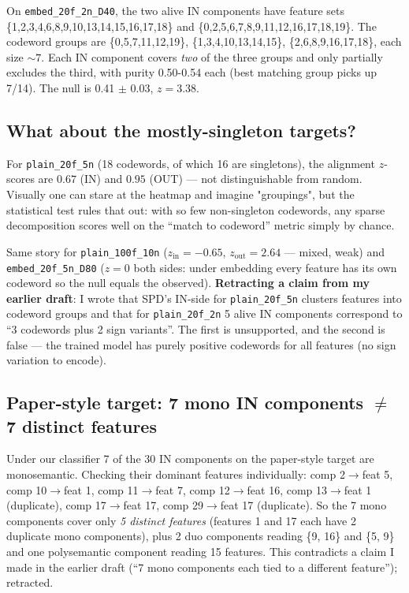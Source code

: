 \documentclass[11pt]{article}
\begin{document}
On \texttt{embed\_20f\_2n\_D40}, the two alive IN components have
feature sets \{1,2,3,4,6,8,9,10,13,14,15,16,17,18\} and
\{0,2,5,6,7,8,9,11,12,16,17,18,19\}. The codeword groups are
\{0,5,7,11,12,19\}, \{1,3,4,10,13,14,15\}, \{2,6,8,9,16,17,18\}, each
size $\sim 7$. Each IN component covers \emph{two} of the three groups
and only partially excludes the third, with purity 0.50-0.54 each (best
matching group picks up 7/14). The null is 0.41 $\pm$ 0.03, $z = 3.38$.

\subsection{What about the mostly-singleton targets?}

For \texttt{plain\_20f\_5n} (18 codewords, of which 16 are singletons),
the alignment $z$-scores are $0.67$ (IN) and $0.95$ (OUT) — not
distinguishable from random. Visually one can stare at the heatmap and
imagine "groupings", but the statistical test rules that out: with so
few non-singleton codewords, any sparse decomposition scores well on
the ``match to codeword'' metric simply by chance.

Same story for \texttt{plain\_100f\_10n} ($z_\mathrm{in} = -0.65$,
$z_\mathrm{out} = 2.64$ — mixed, weak) and
\texttt{embed\_20f\_5n\_D80} ($z = 0$ both sides: under embedding every
feature has its own codeword so the null equals the observed).
\textbf{Retracting a claim from my earlier draft}: I wrote that SPD's
IN-side for \texttt{plain\_20f\_5n} clusters features into codeword
groups and that for \texttt{plain\_20f\_2n} 5 alive IN components
correspond to ``3 codewords plus 2 sign variants''. The first is
unsupported, and the second is false — the trained model has purely
positive codewords for all features (no sign variation to encode).

\subsection{Paper-style target: 7 mono IN components $\neq$ 7 distinct features}

Under our classifier 7 of the 30 IN components on the paper-style
target are monosemantic. Checking their dominant features individually:
comp 2$\to$feat 5, comp 10$\to$feat 1, comp 11$\to$feat 7, comp
12$\to$feat 16, comp 13$\to$feat 1 (duplicate), comp 17$\to$feat 17,
comp 29$\to$feat 17 (duplicate). So the 7 mono components cover only
\emph{5 distinct features} (features 1 and 17 each have 2 duplicate
mono components), plus 2 duo components reading \{9, 16\} and \{5, 9\}
and one polysemantic component reading 15 features. This contradicts
a claim I made in the earlier draft (``7 mono components each tied to
a different feature''); retracted.
\end{document}

